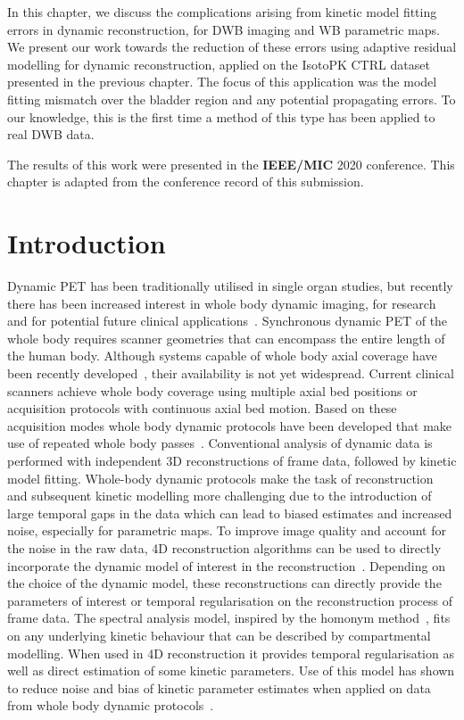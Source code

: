 In this chapter, we discuss the complications arising from kinetic model fitting errors in dynamic reconstruction, for DWB imaging and WB parametric maps. We present our work towards the reduction of these errors using adaptive residual modelling for dynamic reconstruction, applied on the IsotoPK CTRL dataset presented in the previous chapter. The focus of this application was the model fitting mismatch over the bladder region and any potential propagating errors. To our knowledge, this is the first time a method of this type has been applied to real DWB data.

The results of this work were presented in the \textbf{IEEE/MIC} 2020 conference. This chapter is adapted from the conference record of this submission.
\newpage
\section{Introduction}
Dynamic PET has been traditionally utilised in single organ studies, but recently there has been increased interest in whole body dynamic imaging, for research and for potential future clinical applications~\cite{Lammertsma2017,Leahy2018,Rahmim2019,Fahrni2019}. Synchronous dynamic PET of the whole body requires scanner geometries that can encompass the entire length of the human body. Although systems capable of whole body axial coverage have been recently developed~\cite{Cherry2017}, their availability is not yet widespread. Current clinical scanners achieve whole body coverage using multiple axial bed positions or acquisition protocols with continuous axial bed motion. Based on these acquisition modes whole body dynamic protocols have been developed that make use of repeated whole body passes~\cite{Karakatsanis2013}. 
Conventional analysis of dynamic data is performed with independent 3D reconstructions of frame data, followed by kinetic model fitting. Whole-body dynamic protocols make the task of reconstruction and subsequent kinetic modelling more challenging due to the introduction of large temporal gaps in the data which can lead to biased estimates and increased noise, especially for parametric maps. 
To improve image quality and account for the noise in the raw data, 4D reconstruction algorithms can be used to directly incorporate the dynamic model of interest in the reconstruction~\cite{Reader2014}.
Depending on the choice of the dynamic model, these reconstructions can directly provide the parameters of interest or temporal regularisation on the reconstruction process of frame data. The spectral analysis model, inspired by the homonym method~\cite{Cunningham1993}, fits on any underlying kinetic behaviour that can be described by compartmental modelling. When used in 4D reconstruction it provides temporal regularisation as well as direct estimation of some kinetic parameters. Use of this model has shown to reduce noise and bias of kinetic parameter estimates when applied on data from whole body dynamic protocols~\cite{Chalampalakis2019}.

